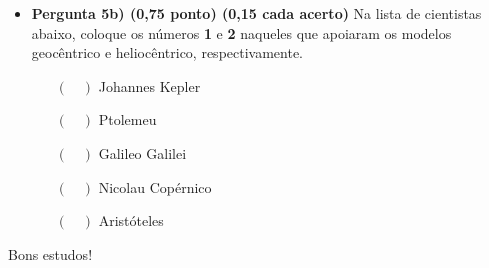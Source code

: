 \documentclass[a4paper, 12pt]{article}
\begin{document}
\begin{itemize}
\begin{itemize}
					\begin{multicols}{2}
						\begin{itemize}
							\item[$(\quad)$] Baricentro
							\item[$(\quad)$] Ponto Vernal
							\item[$(\quad)$] Epicentro
							\item[$(\quad)$] Ápex
						\end{itemize}
					\end{multicols}
				\item \textbf{Pergunta 5b) (0,75 ponto) (0,15 cada acerto)} Na lista de cientistas abaixo, coloque os números \textbf{1} e \textbf{2} naqueles que apoiaram os modelos geocêntrico e heliocêntrico, respectivamente.
					\begin{itemize}
						\item[$(\quad)$] Johannes Kepler
						\item[$(\quad)$] Ptolemeu
						\item[$(\quad)$] Galileo Galilei
						\item[$(\quad)$] Nicolau Copérnico
						\item[$(\quad)$] Aristóteles
					\end{itemize}

			\end{itemize}
			
	\end{itemize}

	\begin{flushright}
		\begin{large}
			Bons estudos!
		\end{large}
	\end{flushright}
\end{document}
